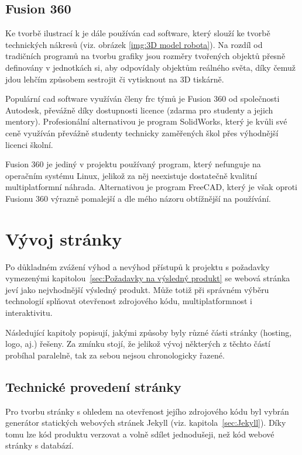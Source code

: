 \documentclass[a4paper, 12pt]{article}
\begin{document}
  \subsection{Fusion 360} \label{sec:Fusion 360}
  Ke tvorbě ilustrací k je dále používán \gls{cad} software, který slouží ke tvorbě technických nákresů (viz. obrázek \ref{img:3D model robota}). Na rozdíl od tradičních programů na tvorbu grafiky jsou rozměry tvořených objektů přesně definovány v jednotkách \gls{si}, aby odpovídaly objektům reálného světa, díky čemuž jdou lehčím způsobem sestrojit či vytisknout na 3D tiskárně.

  Populární \gls{cad} software využíván členy \gls{frc} týmů je Fusion 360 od společnosti Autodesk, převážně díky dostupnosti licence (zdarma pro studenty a jejich mentory). Profesionální alternativou je program SolidWorks, který je kvůli své ceně využíván převážně studenty technicky zaměřených škol přes výhodnější licenci školní.

  Fusion 360 je jediný v projektu používaný program, který nefunguje na operačním systému Linux, jelikož za něj neexistuje dostatečně kvalitní multiplatformní náhrada. Alternativou je program FreeCAD, který je však oproti Fusionu 360 výrazně pomalejší a dle mého názoru obtížnější na používání.


  \section{Vývoj stránky}
  Po důkladném zvážení výhod a nevýhod přístupů k projektu s požadavky vymezenými kapitolou~\ref{sec:Požadavky na výsledný produkt} se webová stránka jeví jako nejvhodnější výsledný produkt. Může totiž při správném výběru technologií splňovat otevřenost zdrojového kódu, multiplatformnost i interaktivitu.

  Následující kapitoly popisují, jakými způsoby byly různé části stránky (hosting, logo, aj.) řešeny. Za zmínku stojí, že jelikož vývoj některých z těchto částí probíhal paralelně, tak za sebou nejsou chronologicky řazené.


  \subsection{Technické provedení stránky}
  Pro tvorbu stránky s ohledem na otevřenost jejího zdrojového kódu byl vybrán generátor statických webových stránek Jekyll (viz. kapitola~\ref{sec:Jekyll}). Díky tomu lze kód produktu verzovat a volně sdílet jednodušeji, než kód webové stránky s databází.
\end{document}

